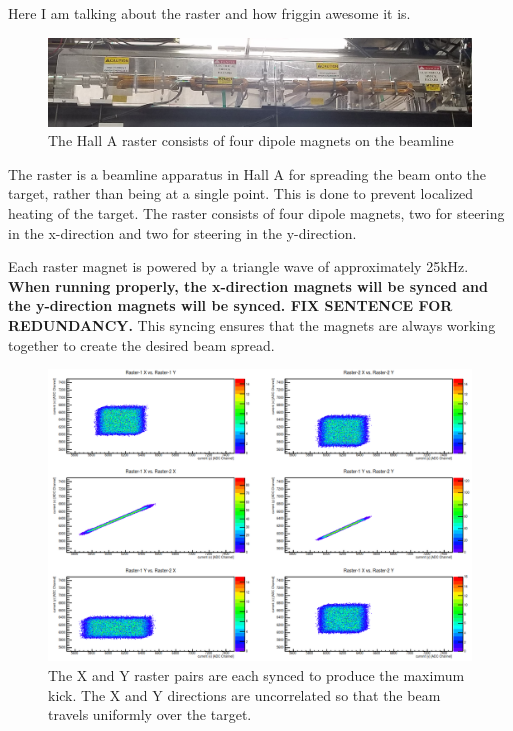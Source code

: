 Here I am talking about the raster and how friggin awesome it is.

\begin{figure}
	\includegraphics[width=\linewidth]{./chap2-exp/fig/raster_pic.jpg}
	\caption{The Hall A raster consists of four dipole magnets on the beamline}
	\label{fig:raster}
\end{figure}

The raster is a beamline apparatus in Hall A for spreading the beam onto the target, rather than being at a single point. This is done to prevent localized heating of the target. The raster consists of four dipole magnets, two for steering in the x-direction and two for steering in the y-direction.

Each raster magnet is powered by a triangle wave of approximately 25kHz. \textbf{When running properly, the x-direction magnets will be synced and the y-direction magnets will be synced. FIX SENTENCE FOR REDUNDANCY.} This syncing ensures that the magnets are always working together to create the desired beam spread.

\begin{figure}
	\includegraphics[width=\linewidth]{./chap2-exp/fig/raster_sync.png}
	\caption{The X and Y raster pairs are each synced to produce the maximum kick. The X and Y directions are uncorrelated so that the beam travels uniformly over the target.}
	\label{fig:raster}
\end{figure}
